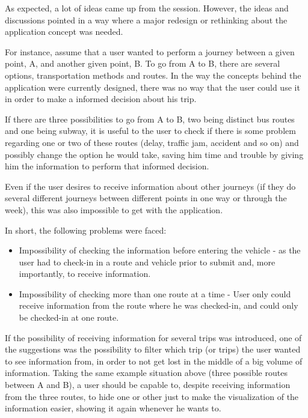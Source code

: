 As expected, a lot of ideas came up from the session. However, the ideas and discussions pointed in a way where a major redesign or rethinking about the application concept was needed.

For instance, assume that a user wanted to perform a journey between a given point, A, and another given point, B. To go from A to B, there are several options, transportation methods and routes. In the way the concepts behind the application were currently designed, there was no way that the user could use it in order to make a informed decision about his trip. 

If there are three possibilities to go from A to B, two being distinct bus routes and one being subway, it is useful to the user to check if there is some problem regarding one  or two of these routes (delay, traffic jam, accident and so on) and possibly change the option he would take, saving him time and trouble by giving him the information to perform that informed decision.

Even if the user desires to receive information about other journeys (if they do several different journeys between different points in one way or through the week), this was also impossible to get with the application.

In short, the following problems were faced: 

\begin{itemize}
\item Impossibility of checking the information before entering the vehicle - as the user had to check-in in a route and vehicle prior to  submit and, more importantly, to receive information. 
\item Impossibility of checking more than one route at a time - User only could receive information from the route where he was checked-in, and could only be checked-in at one route. 
\end{itemize}

If the possibility of receiving information for several trips was introduced, one of the suggestions was the possibility to filter which trip (or trips) the user wanted to see information from, in order to not get lost in the middle of a big volume of information. Taking the same example situation above (three possible routes between A and B), a user should be capable to, despite receiving information from the three routes, to hide one or other just to make the visualization of the information easier, showing it again whenever he wants to. 

